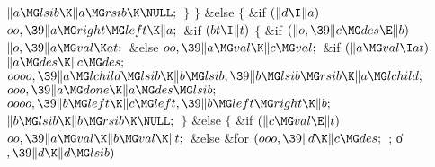 ${}\|a\MG\\{lsib}\K\|a\MG\\{rsib}\K\NULL;{}$\6
\4${}\}{}$\2\6
\4${}\}{}$\5
\2\&{else}\5
${}\{{}$\1\6
\&{if} ${}(\|d\I\|a){}$\1\5
${}\\{oo},\39\|a\MG\\{right}\MG\\{left}\K\|a;{}$\2\6
\&{if} ${}(\\{bt}\I\|t){}$\5
${}\{{}$\1\6
\&{if} ${}(\|o,\39\|c\MG\\{des}\E\|b){}$\1\5
${}\|o,\39\|a\MG\\{val}\K\\{at};{}$\2\6
\&{else}\1\5
${}\\{oo},\39\|a\MG\\{val}\K\|c\MG\\{val};{}$\2\6
\&{if} ${}(\|a\MG\\{val}\I\\{at}){}$\1\5
${}\|a\MG\\{des}\K\|c\MG\\{des};{}$\2\6
${}\\{oooo},\39\|a\MG\\{lchild}\MG\\{lsib}\K\|b\MG\\{lsib},\39\|b\MG\\{lsib}\MG%
\\{rsib}\K\|a\MG\\{lchild};{}$\6
${}\\{ooo},\39\|a\MG\\{done}\K\|a\MG\\{des}\MG\\{lsib};{}$\6
${}\\{oooo},\39\|b\MG\\{left}\K\|c\MG\\{left},\39\|b\MG\\{left}\MG\\{right}\K%
\|b;{}$\6
${}\|b\MG\\{lsib}\K\|b\MG\\{rsib}\K\NULL;{}$\6
\4${}\}{}$\5
\2\&{else}\5
${}\{{}$\1\6
\&{if} ${}(\|c\MG\\{val}\E\|t){}$\1\5
${}\\{oo},\39\|a\MG\\{val}\K\|b\MG\\{val}\K\|t;{}$\2\6
\&{else}\5
\1\&{for} ${}(\\{ooo},\39\|d\K\|c\MG\\{des};{}$  ; \|o${},\39\|d\K\|d\MG%
\\{lsib}){}$\1\6
